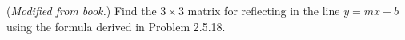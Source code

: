 \documentclass[../main.tex]{subfiles}
\begin{document}
(\emph{Modified from book.})
Find the $3\times3$ matrix for reflecting in the line $y = mx + b$ using the formula derived in Problem 2.5.18.

\solution
\end{document}
